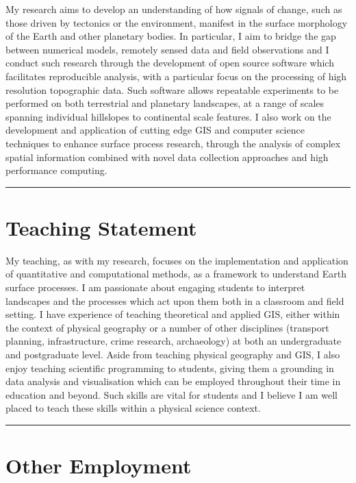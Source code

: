 \documentclass[10pt, a4paper]{article}
\begin{document}
  My research aims to develop an understanding of how signals of change, such as those driven by tectonics or the environment, manifest in the surface morphology of the Earth and other planetary bodies. In particular, I aim to bridge the gap between numerical models, remotely sensed data and field observations and I conduct such research through the development of open source software which facilitates reproducible analysis, with a particular focus on the processing of high resolution topographic data. Such software allows repeatable experiments to be performed on both terrestrial and planetary landscapes, at a range of scales spanning individual hillslopes to continental scale features. I also work on the development and application of cutting edge GIS and computer science techniques to enhance surface process research, through the analysis of complex spatial information combined with novel data collection approaches and high performance computing.\\[0.05cm]

  \hrule
  \section*{Teaching Statement}
  \noindent

  My teaching, as with my research, focuses on the implementation and application of quantitative and computational methods, as a framework to understand Earth surface processes. I am passionate about engaging students to interpret landscapes and the processes which act upon them both in a classroom and field setting. I have experience of teaching theoretical and applied GIS, either within the context of physical geography or a number of other disciplines (transport planning, infrastructure, crime research, archaeology) at both an undergraduate and postgraduate level. Aside from teaching physical geography and GIS, I also enjoy teaching scientific programming to students, giving them a grounding in data analysis and visualisation which can be employed throughout their time in education and beyond. Such skills are vital for students and I believe I am well placed to teach these skills within a physical science context.\\[0.05cm]

\fi

\hrule
\section*{Other Employment}
\noindent
\end{document}
